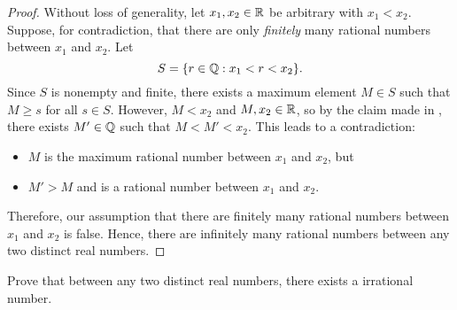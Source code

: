 \begin{proof}
  Without loss of generality, let $x_{1}, x_{2} \in \mathbb{R}$ be arbitrary with $x_{1} < x_{2}$. Suppose, for 
  contradiction, that there are only \textit{finitely} many rational numbers between $x_{1}$ and $x_{2}$. Let
  \[
    S = \{r \in \mathbb{Q} : x_{1} < r < x_{2} \}.
  \]
  Since $S$ is nonempty and finite, there exists a maximum element $M \in S$
  such that $M \geq s$ for all $s \in S$. However, $M < x_{2}$ and $M, x_{2} \in \mathbb{R}$, 
  so by the claim made in , there exists $M' \in \mathbb{Q}$ 
  such that $M < M' < x_{2}$. This leads to a contradiction:
  \begin{itemize}
    \item $M$ is the maximum rational number between $x_{1}$ and $x_{2}$, but
    \item $M' > M$ and is a rational number between $x_{1}$ and $x_{2}$.
  \end{itemize}
  Therefore, our assumption that there are finitely many rational numbers
  between $x_{1}$ and $x_{2}$ is false. Hence, there are infinitely many rational
  numbers between any two distinct real numbers.
\end{proof}

\begin{problem}\label{prob:density-irrationals-in-reals}
  Prove that between any two distinct real numbers, there exists a irrational number.
\end{problem}

